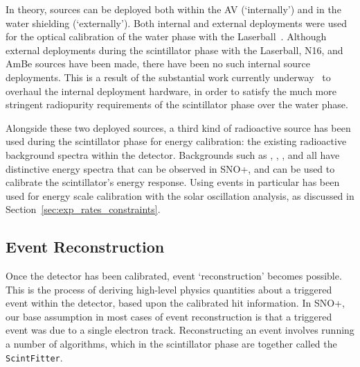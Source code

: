 In theory, sources can be deployed both within the AV (`internally') and in the water shielding (`externally'). Both internal and external deployments were used for the optical calibration of the water phase with the Laserball~\cite{andersonOpticalCalibrationSNO2021}. Although external deployments during the scintillator phase with the Laserball, N16, and AmBe sources have been made, there have been no such internal source deployments. This is a result of the substantial work currently underway~\cite{valderLaserballCalibrationDevice} to overhaul the internal deployment hardware, in order to satisfy the much more stringent radiopurity requirements of the scintillator phase over the water phase.

Alongside these two deployed sources, a third kind of radioactive source has been used during the scintillator phase for energy calibration: the existing radioactive background spectra within the detector. Backgrounds such as , , , and  all have distinctive energy spectra that can be observed in SNO+, and can be used to calibrate the scintillator's energy response. Using  events in particular has been used for energy scale calibration with the solar oscillation analysis, as discussed in Section~\ref{sec:exp_rates_constraints}.

\subsection{Event Reconstruction}\label{sec:ev_reco}
Once the detector has been calibrated, event `reconstruction' becomes possible. This is the process of deriving high-level physics quantities about a triggered event within the detector, based upon the calibrated hit information. In SNO+, our base assumption in most cases of event reconstruction is that a triggered event was due to a single electron track. Reconstructing an event involves running a number of algorithms, which in the scintillator phase are together called the \texttt{ScintFitter}.

